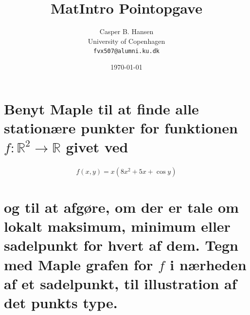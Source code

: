\documentclass[11pt,a4paper]{article}
\title{MatIntro Pointopgave \assignmentnumber}
\author
{
    Casper B. Hansen\\
    University of Copenhagen\\
    {\tt fvx507@alumni.ku.dk}
}
\date{\today}
\begin{document}


\section
{
    \mdseries
    Benyt Maple til at finde alle stationære punkter for funktionen $f :
    \mathbb{R}^2 \rightarrow \mathbb{R}$ givet ved
}
\begin{align}
    f(x,y) = x(8x^2 + 5x + \cos y)
    \label{eqn:8.1-function}
\end{align}
\section*
{
    \mdseries
    og til at afgøre, om der er tale om lokalt maksimum, minimum eller
    sadelpunkt for hvert af dem. Tegn med Maple grafen for $f$ i nærheden af
    et sadelpunkt, til illustration af det punkts type.
}
\end{document}
